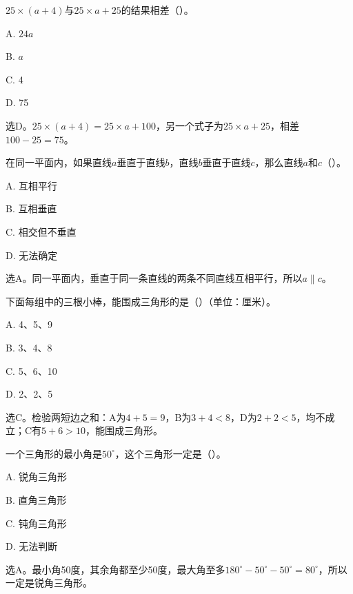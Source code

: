 \(25\times(a+4)\)与\(25\times a+25\)的结果相差（\hspace{1.8em}）。\par
\noindent A. \(24a\)\par
\noindent B. \(a\)\par
\noindent C. 4\par
\noindent D. 75\par
\begin{BookAnswer}
选D。\(25\times(a+4)=25\times a+100\)，另一个式子为\(25\times a+25\)，相差\(100-25=75\)。
\end{BookAnswer}

在同一平面内，如果直线\(a\)垂直于直线\(b\)，直线\(b\)垂直于直线\(c\)，那么直线\(a\)和\(c\)（\hspace{1.8em}）。\par
\noindent A. 互相平行\par
\noindent B. 互相垂直\par
\noindent C. 相交但不垂直\par
\noindent D. 无法确定\par
\begin{BookAnswer}
选A。同一平面内，垂直于同一条直线的两条不同直线互相平行，所以\(a\parallel c\)。
\end{BookAnswer}

下面每组中的三根小棒，能围成三角形的是（\hspace{1.8em}）（单位：厘米）。\par
\noindent A. 4、5、9\par
\noindent B. 3、4、8\par
\noindent C. 5、6、10\par
\noindent D. 2、2、5\par
\begin{BookAnswer}
选C。检验两短边之和：A为\(4+5=9\)，B为\(3+4<8\)，D为\(2+2<5\)，均不成立；C有\(5+6>10\)，能围成三角形。
\end{BookAnswer}

一个三角形的最小角是\(50^\circ\)，这个三角形一定是（\hspace{1.8em}）。\par
\noindent A. 锐角三角形\par
\noindent B. 直角三角形\par
\noindent C. 钝角三角形\par
\noindent D. 无法判断\par
\begin{BookAnswer}
选A。最小角50度，其余角都至少50度，最大角至多\(180^\circ-50^\circ-50^\circ=80^\circ\)，所以一定是锐角三角形。
\end{BookAnswer}

